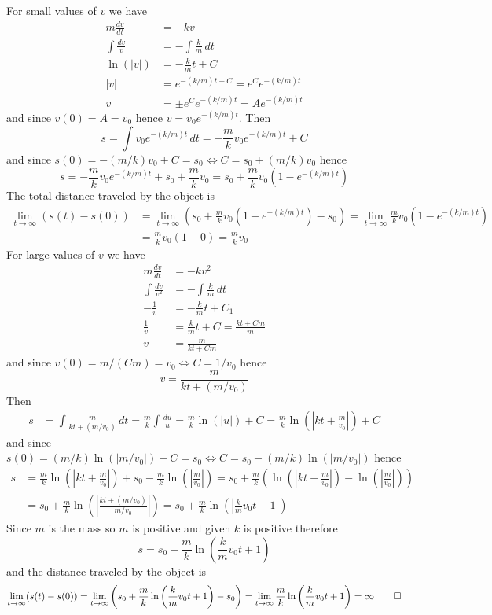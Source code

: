 \begin{solution}
    For small values of \(v\) we have
    \begin{align*}
        m\frac{dv}{dt} &= -kv \\
        \int\frac{dv}{v} &= -\int\frac{k}{m}\,dt \\
        \ln(|v|) &= -\frac{k}{m}t+C \\
        |v| &= e^{-(k/m)t+C}=e^Ce^{-(k/m)t} \\
        v &= \pm e^Ce^{-(k/m)t}=Ae^{-(k/m)t}
    \end{align*}
    and since \(v(0)=A=v_0\) hence \(v=v_0e^{-(k/m)t}\).
    Then
    \[s=\int v_0e^{-(k/m)t}\,dt=-\frac{m}{k}v_0e^{-(k/m)t}+C\]
    and since \(s(0)=-(m/k)v_0+C=s_0\iff C=s_0+(m/k)v_0\) hence
    \[s=-\frac{m}{k}v_0e^{-(k/m)t}+s_0+\frac{m}{k}v_0
    =s_0+\frac{m}{k}v_0(1-e^{-(k/m)t})\]
    The total distance traveled by the object is
    \begin{align*}
        \lim_{t\to\infty}(s(t)-s(0))
        &= \lim_{t\to\infty}\left(s_0+\frac{m}{k}v_0(1-e^{-(k/m)t})-s_0\right)
        =\lim_{t\to\infty}\frac{m}{k}v_0(1-e^{-(k/m)t}) \\
        &= \frac{m}{k}v_0(1-0)=\frac{m}{k}v_0
    \end{align*}
    For large values of \(v\) we have
    \begin{align*}
        m\frac{dv}{dt} &= -kv^2 \\
        \int\frac{dv}{v^2} &= -\int\frac{k}{m}\,dt \\
        -\frac{1}{v} &= -\frac{k}{m}t+C_1 \\
        \frac{1}{v} &= \frac{k}{m}t+C=\frac{kt+Cm}{m} \\
        v &= \frac{m}{kt+Cm}
    \end{align*}
    and since \(v(0)=m/(Cm)=v_0\iff C=1/v_0\) hence
    \[v=\frac{m}{kt+(m/v_0)}\]
    Then
    \begin{align*}
        s &= \int\frac{m}{kt+(m/v_0)}\,dt=\frac{m}{k}\int\frac{du}{u}
        =\frac{m}{k}\ln(|u|)+C
        =\frac{m}{k}\ln\left(\left|kt+\frac{m}{v_0}\right|\right)+C
    \end{align*}
    and since \(s(0)=(m/k)\ln(|m/v_0|)+C=s_0\iff C=s_0-(m/k)\ln(|m/v_0|)\)
    hence
    \begin{align*}
        s &= \frac{m}{k}\ln\left(\left|kt+\frac{m}{v_0}\right|\right)+s_0
        -\frac{m}{k}\ln\left(\left|\frac{m}{v_0}\right|\right)
        =s_0+\frac{m}{k}\left(\ln\left(\left|kt+\frac{m}{v_0}\right|\right)
        -\ln\left(\left|\frac{m}{v_0}\right|\right)\right) \\
        &= s_0+\frac{m}{k}
        \ln\left(\left|\frac{kt+(m/v_0)}{m/v_0}\right|\right)
        =s_0+\frac{m}{k}\ln\left(\left|\frac{k}{m}v_0t+1\right|\right)
    \end{align*}
    Since \(m\) is the mass so \(m\) is positive and given \(k\) is positive
    therefore
    \[s=s_0+\frac{m}{k}\ln\left(\frac{k}{m}v_0t+1\right)\]
    and the distance traveled by the object is
    \[\lim_{t\to\infty}(s(t)-s(0))
    =\lim_{t\to\infty}\left(s_0
    +\frac{m}{k}\ln\left(\frac{k}{m}v_0t+1\right)-s_0\right)=
    \lim_{t\to\infty}\frac{m}{k}\ln\left(\frac{k}{m}v_0t+1\right)
    =\infty\qedhere\]
\end{solution}
